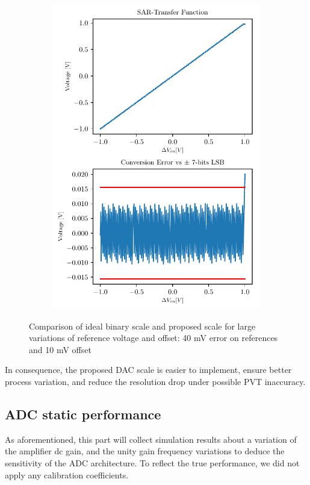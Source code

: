 \begin{figure}[htp]
\begin{subfigure}[b]{0.4\textwidth}
		\includegraphics[width=\textwidth]{Chapter4/Figs/results/sar_resilience/sar-osr6-done-40mVref-10mVoffset.pdf}
	\end{subfigure}
	\caption{Comparison of ideal binary scale and proposed scale for large variations of reference voltage and offset: 40 mV error on references and 10 mV offset}
	\label{fig:sar-ideal-proposed-scale}
\end{figure}

In consequence, the proposed DAC scale is easier to implement, ensure better process variation, and reduce the resolution drop under possible PVT inaccuracy.

\subsection{ADC static performance}
As aforementioned, this part will collect simulation results about a variation of the amplifier dc gain, and the unity gain frequency variations to deduce the sensitivity of the ADC architecture. To reflect the true performance, we did not apply any calibration coefficients.

